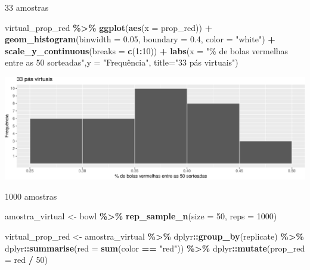 \documentclass[
  9pt,
  ignorenonframetext,
  aspectratio=169]{beamer}
\newenvironment{Shaded}{\begin{snugshade}}{\end{snugshade}}
\newcommand{\DataTypeTok}[1]{\textcolor[rgb]{0.13,0.29,0.53}{#1}}
\newcommand{\DecValTok}[1]{\textcolor[rgb]{0.00,0.00,0.81}{#1}}
\newcommand{\FloatTok}[1]{\textcolor[rgb]{0.00,0.00,0.81}{#1}}
\newcommand{\KeywordTok}[1]{\textcolor[rgb]{0.13,0.29,0.53}{\textbf{#1}}}
\newcommand{\NormalTok}[1]{#1}
\newcommand{\OperatorTok}[1]{\textcolor[rgb]{0.81,0.36,0.00}{\textbf{#1}}}
\newcommand{\StringTok}[1]{\textcolor[rgb]{0.31,0.60,0.02}{#1}}
\begin{document}
\begin{frame}[fragile]{33 amostras}
\protect\hypertarget{amostras-1}{}
\begin{Shaded}
\begin{Highlighting}[]
\NormalTok{virtual\_prop\_red }\OperatorTok{\%\textgreater{}\%}\StringTok{ }\KeywordTok{ggplot}\NormalTok{(}\KeywordTok{aes}\NormalTok{(}\DataTypeTok{x =}\NormalTok{ prop\_red)) }\OperatorTok{+}
\StringTok{  }\KeywordTok{geom\_histogram}\NormalTok{(}\DataTypeTok{binwidth =} \FloatTok{0.05}\NormalTok{, }\DataTypeTok{boundary =} \FloatTok{0.4}\NormalTok{, }\DataTypeTok{color =} \StringTok{"white"}\NormalTok{) }\OperatorTok{+}
\StringTok{  }\KeywordTok{scale\_y\_continuous}\NormalTok{(}\DataTypeTok{breaks =} \KeywordTok{c}\NormalTok{(}\DecValTok{1}\OperatorTok{:}\DecValTok{10}\NormalTok{)) }\OperatorTok{+}
\StringTok{  }\KeywordTok{labs}\NormalTok{(}\DataTypeTok{x =} \StringTok{"\% de bolas vermelhas entre as 50 sorteadas"}\NormalTok{,}\DataTypeTok{y =} \StringTok{"Frequência"}\NormalTok{,}
       \DataTypeTok{title=}\StringTok{"33 pás virtuais"}\NormalTok{) }
\end{Highlighting}
\end{Shaded}

\includegraphics{aula_09_files/figure-beamer/unnamed-chunk-7-1.pdf}
\end{frame}

\begin{frame}[fragile]{1000 amostras}
\protect\hypertarget{amostras-2}{}
\begin{Shaded}
\begin{Highlighting}[]
\NormalTok{amostra\_virtual \textless{}{-}}\StringTok{ }\NormalTok{bowl }\OperatorTok{\%\textgreater{}\%}\StringTok{ }
\StringTok{  }\KeywordTok{rep\_sample\_n}\NormalTok{(}\DataTypeTok{size =} \DecValTok{50}\NormalTok{, }\DataTypeTok{reps =} \DecValTok{1000}\NormalTok{)}

\NormalTok{virtual\_prop\_red \textless{}{-}}\StringTok{ }\NormalTok{amostra\_virtual }\OperatorTok{\%\textgreater{}\%}\StringTok{ }
\StringTok{  }\NormalTok{dplyr}\OperatorTok{::}\KeywordTok{group\_by}\NormalTok{(replicate) }\OperatorTok{\%\textgreater{}\%}\StringTok{ }
\StringTok{  }\NormalTok{dplyr}\OperatorTok{::}\KeywordTok{summarise}\NormalTok{(}\DataTypeTok{red =} \KeywordTok{sum}\NormalTok{(color }\OperatorTok{==}\StringTok{ "red"}\NormalTok{)) }\OperatorTok{\%\textgreater{}\%}\StringTok{ }
\StringTok{  }\NormalTok{dplyr}\OperatorTok{::}\KeywordTok{mutate}\NormalTok{(}\DataTypeTok{prop\_red =}\NormalTok{ red }\OperatorTok{/}\StringTok{ }\DecValTok{50}\NormalTok{)}
\end{Highlighting}
\end{Shaded}
\end{frame}
\end{document}
